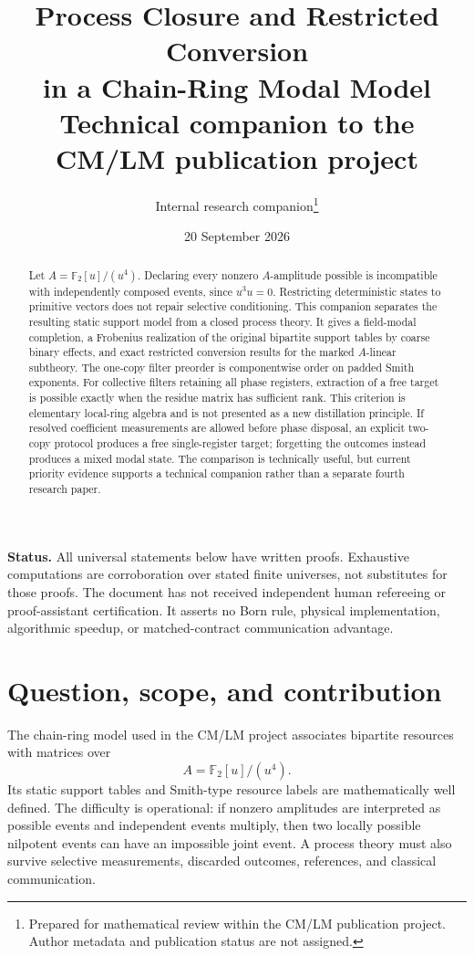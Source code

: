 \documentclass[11pt]{article}
\title{\textbf{Process Closure and Restricted Conversion\\in a Chain-Ring Modal Model}\\[0.4em]
\large Technical companion to the CM/LM publication project}
\author{Internal research companion\thanks{Prepared for mathematical review within the CM/LM publication project. Author metadata and publication status are not assigned.}}
\date{20 September 2026}
\theoremstyle{definition}
\theoremstyle{remark}
\newcommand{\F}{\mathbb F_2}
\begin{document}
\maketitle

\begin{abstract}
Let $A=\F[u]/(u^4)$. Declaring every nonzero $A$-amplitude possible is incompatible with independently composed events, since $u^3u=0$. Restricting deterministic states to primitive vectors does not repair selective conditioning. This companion separates the resulting static support model from a closed process theory. It gives a field-modal completion, a Frobenius realization of the original bipartite support tables by coarse binary effects, and exact restricted conversion results for the marked $A$-linear subtheory. The one-copy filter preorder is componentwise order on padded Smith exponents. For collective filters retaining all phase registers, extraction of a free target is possible exactly when the residue matrix has sufficient rank. This criterion is elementary local-ring algebra and is not presented as a new distillation principle. If resolved coefficient measurements are allowed before phase disposal, an explicit two-copy protocol produces a free single-register target; forgetting the outcomes instead produces a mixed modal state. The comparison is technically useful, but current priority evidence supports a technical companion rather than a separate fourth research paper.
\end{abstract}

\noindent\textbf{Status.}
All universal statements below have written proofs. Exhaustive computations are corroboration over stated finite universes, not substitutes for those proofs. The document has not received independent human refereeing or proof-assistant certification. It asserts no Born rule, physical implementation, algorithmic speedup, or matched-contract communication advantage.

\section{Question, scope, and contribution}

The chain-ring model used in the CM/LM project associates bipartite resources with matrices over
\[
  A=\F[u]/(u^4).
\]
Its static support tables and Smith-type resource labels are mathematically well defined. The difficulty is operational: if nonzero amplitudes are interpreted as possible events and independent events multiply, then two locally possible nilpotent events can have an impossible joint event. A process theory must also survive selective measurements, discarded outcomes, references, and classical communication.
\end{document}
